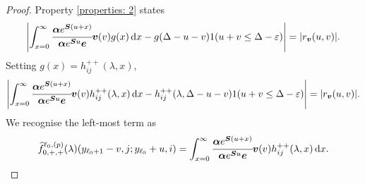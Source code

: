 \begin{proof} 
                Property \ref{properties: 2} states
                \begin{align}
                	\left|\int_{x=0}^\infty \cfrac{\boldsymbol \alpha e^{\boldsymbol{S}(u+x)} }{\boldsymbol \alpha e^{\boldsymbol{S}u} \boldsymbol e} {\boldsymbol v}(v)g(x)\, \mathrm{d} x -g(\Delta-u-v) 1(u+v\leq\Delta-\varepsilon)\right| =  |r_{\boldsymbol v}(u,v)|.
                \end{align}
                Setting \(g(x) = h_{ij}^{++}(\lambda,x)\), 
                \begin{align}
                	\left|\int_{x=0}^\infty \cfrac{\boldsymbol \alpha e^{\boldsymbol{S}(u+x)} }{\boldsymbol \alpha e^{\boldsymbol{S}u} \boldsymbol e} {\boldsymbol v}(v)h_{ij}^{++}(\lambda,x)\, \mathrm{d} x -h_{ij}^{++}(\lambda,\Delta-u-v) 1(u+v\leq\Delta-\varepsilon)\right| =  |r_{\boldsymbol v}(u,v)|. \label{eqn: akv}
                \end{align}
                We recognise the left-most term as 
                \[\widehat f^{\ell_0,(p)}_{0,+,+}(\lambda)(y_{\ell_0+1}-v,j; y_{\ell_0}+u,i) = \int_{x=0}^\infty \cfrac{\boldsymbol \alpha e^{\boldsymbol{S}(u+x)} }{\boldsymbol \alpha e^{\boldsymbol{S}u} \boldsymbol e} {\boldsymbol v}(v)h_{ij}^{++}(\lambda,x)\, \mathrm{d} x.\]
                

\end{proof}
